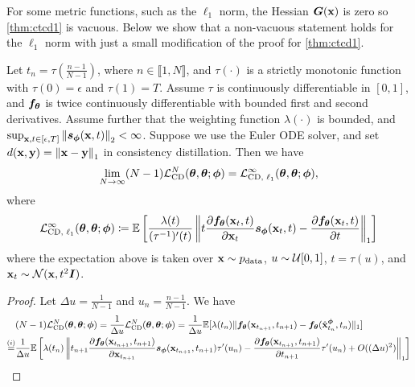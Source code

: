 \begin{appendices}
For some metric functions, such as the $\ell_1$ norm, the Hessian ${\bm{G}}({\mathbf{x}})$ is zero so \cref{thm:ctcd1} is vacuous. Below we show that a non-vacuous statement holds for the $\ell_1$ norm with just a small modification of the proof for \cref{thm:ctcd1}.
\begin{theorem}\label{thm:ctcd_l1}
    Let $t_n = \tau(\frac{n-1}{N-1})$, where $n \in \llbracket 1, N \rrbracket$, and $\tau(\cdot)$ is a strictly monotonic function with $\tau(0) = \epsilon$ and $\tau(1) = T$. Assume $\tau$ is continuously differentiable in $[0,1]$, and ${\bm{f}}_{{\bm{\theta}}}$ is twice continuously differentiable with bounded first and second derivatives. Assume further that the weighting function $\lambda(\cdot)$ is bounded, and $\sup_{{\mathbf{x}}, t\in[\epsilon,T]}\left\lVert{\bm{s}}_{\bm{\phi}}({\mathbf{x}}, t)\right\rVert_2 < \infty$. Suppose we use the Euler ODE solver, and set $d({\mathbf{x}}, {\mathbf{y}}) = \left\lVert{\mathbf{x}} - {\mathbf{y}}\right\rVert_1$ in consistency distillation. Then we have
    \begin{align}
        \lim_{N \to \infty} (N-1) \mathcal{L}_\text{CD}^N({\bm{\theta}}, {\bm{\theta}}; {\bm{\phi}}) = \mathcal{L}_\text{CD, $\ell_1$}^\infty({\bm{\theta}}, {\bm{\theta}}; {\bm{\phi}}),\label{eq:ctcd_l1_obj}
    \end{align}
    where
    \begin{align*}
        \mathcal{L}_\text{CD, $\ell_1$}^\infty({\bm{\theta}}, {\bm{\theta}}; {\bm{\phi}}) \coloneqq \mathbb{E}\left[\frac{\lambda(t)}{(\tau^{-1})'(t)}\left\lVert t \frac{\partial {\bm{f}}_{\bm{\theta}}({\mathbf{x}}_{t}, t)}{\partial {\mathbf{x}}_{t}}{\bm{s}}_{\bm{\phi}}({\mathbf{x}}_{t}, t)  - \frac{\partial {\bm{f}}_{\bm{\theta}}({\mathbf{x}}_{t}, t)}{\partial t}\right\rVert_1\right]
    \end{align*}
    where the expectation above is taken over ${\mathbf{x}} \sim p_\text{data}$, $u \sim \mathcal{U}[0, 1]$, $t = \tau(u)$, and ${\mathbf{x}}_t \sim \mathcal{N}({\mathbf{x}}, t^2{\bm{I}})$.
\end{theorem}
\begin{proof}
    Let $\Delta u = \frac{1}{N-1}$ and $u_n = \frac{n-1}{N-1}$. We have
    \begin{align}
        &(N-1) \mcal{L}_\text{CD}^N(\vtheta, \vtheta; \vphi) = \frac{1}{\Delta u}\mcal{L}_\text{CD}^N(\vtheta, \vtheta; \vphi) = \frac{1}{\Delta u} \mbb{E}[\lambda(t_n)\| \vf_\vtheta(\rvx_{t_{n+1}}, t_{n+1}) - \vf_{\vtheta}(\hat{\rvx}_{t_n}^\vphi, t_n)\|_1]\notag \\
        \stackrel{(i)}{=}& \frac{1}{\Delta u} \mbb{E}\left[\lambda(t_n)\norm{t_{n+1} \frac{\partial \vf_\vtheta(\rvx_{t_{n+1}}, t_{n+1})}{\partial \rvx_{t_{n+1}}}\vs_\vphi(\rvx_{t_{n+1}}, t_{n+1})\tau'(u_{n}) - \frac{\partial \vf_\vtheta(\rvx_{t_{n+1}}, t_{n+1})}{\partial t_{n+1}}\tau'(u_{n}) + O((\Delta u)^2)}_1\right]\notag\\

\end{align}
\end{proof}
\end{appendices}
